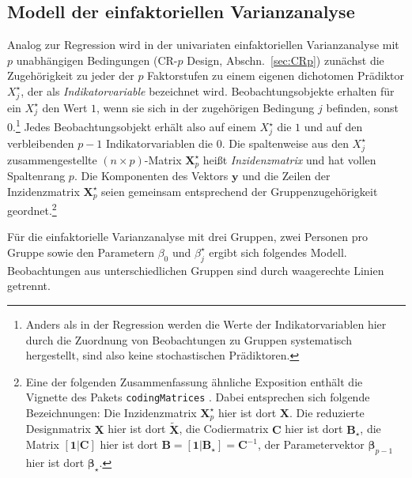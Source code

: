 \subsection{Modell der einfaktoriellen Varianzanalyse}
\label{sec:multALManova}

Analog zur Regression wird in der univariaten einfaktoriellen Varianzanalyse mit $p$ unabhängigen Bedingungen (CR-$p$ Design, Abschn.\ \ref{sec:CRp}) zunächst die Zugehörigkeit zu jeder der $p$ Faktorstufen zu einem eigenen dichotomen Prädiktor $X_{j}^{\star}$, der als \emph{Indikatorvariable} bezeichnet wird. Beobachtungsobjekte erhalten für ein $X_{j}^{\star}$ den Wert $1$, wenn sie sich in der zugehörigen Bedingung $j$ befinden, sonst $0$.\footnote{Anders als in der Regression werden die Werte der Indikatorvariablen hier durch die Zuordnung von Beobachtungen zu Gruppen systematisch hergestellt, sind also keine stochastischen Prädiktoren.} Jedes Beobachtungsobjekt erhält also auf einem $X_{j}^{\star}$ die $1$ und auf den verbleibenden $p-1$ Indikatorvariablen die $0$. Die spaltenweise aus den $X_{j}^{\star}$ zusammengestellte $(n \times p)$-Matrix $\bm{X}_{p}^{\star}$ heißt \emph{Inzidenzmatrix} und hat vollen Spaltenrang $p$. Die Komponenten des Vektors $\bm{y}$ und die Zeilen der Inzidenzmatrix $\bm{X}_{p}^{\star}$ seien gemeinsam entsprechend der Gruppenzugehörigkeit geordnet.\footnote{Eine der folgenden Zusammenfassung ähnliche Exposition enthält die Vignette des Pakets \lstinline!codingMatrices! \cite{Venables2016}. Dabei entsprechen sich folgende Bezeichnungen: Die Inzidenzmatrix $\bm{X}_{p}^{\star}$ hier ist dort $\bm{X}$. Die reduzierte Designmatrix $\bm{X}$ hier ist dort $\widetilde{\bm{X}}$, die Codiermatrix $\bm{C}$ hier ist dort $\bm{B}_{\star}$, die Matrix $[\bm{1} | \bm{C}]$ hier ist dort $\bm{B} = [\bm{1} | \bm{B}_{\star}] = \bm{C}^{-1}$, der Parametervektor $\bm{\beta}_{p-1}$ hier ist dort $\bm{\beta}_{\star}$.}

Für die einfaktorielle Varianzanalyse mit drei Gruppen, zwei Personen pro Gruppe sowie den Parametern $\beta_{0}$ und $\beta_{j}^{\star}$ ergibt sich folgendes Modell. Beobachtungen aus unterschiedlichen Gruppen sind durch waagerechte Linien getrennt.

